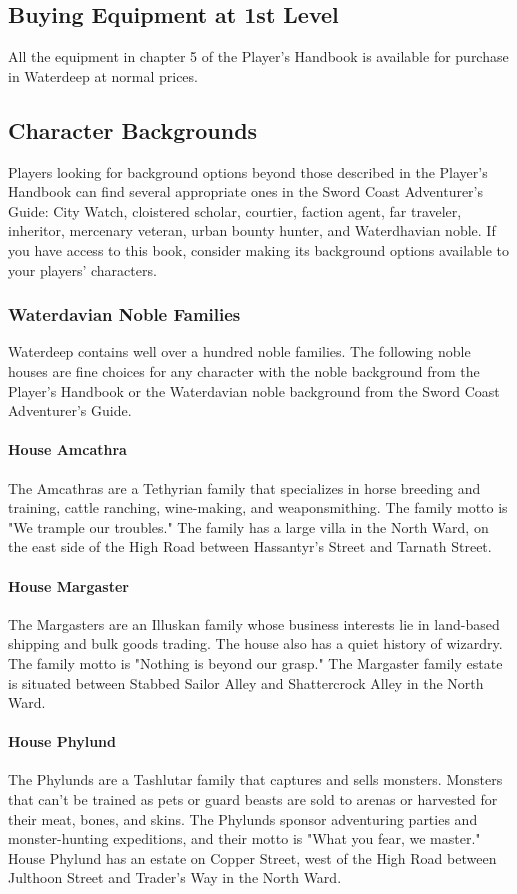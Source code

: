 \documentclass[10pt,a4paper,twoside,twocolumn,openany,nodeprecatedcode]{dndbook}
\begin{document}
\subsection{Buying Equipment at 1st Level}
All the equipment in chapter 5 of the Player's Handbook is available for purchase in Waterdeep at normal prices.
\subsection{Character Backgrounds}
Players looking for background options beyond those described in the Player's Handbook can find several appropriate ones in the Sword Coast Adventurer's Guide: City Watch, cloistered scholar, courtier, faction agent, far traveler, inheritor, mercenary veteran, urban bounty hunter, and Waterdhavian noble. If you have access to this book, consider making its background options available to your players' characters.
\subsubsection{Waterdavian Noble Families}
Waterdeep contains well over a hundred noble families. The following noble houses are fine choices for any character with the noble background from the Player's Handbook or the Waterdavian noble background from the Sword Coast Adventurer's Guide.
\paragraph{House Amcathra}
The Amcathras are a Tethyrian family that specializes in horse breeding and training, cattle ranching, wine-making, and weaponsmithing. The family motto is "We trample our troubles." The family has a large villa in the North Ward, on the east side of the High Road between Hassantyr's Street and Tarnath Street.
\paragraph{House Margaster}
The Margasters are an Illuskan family whose business interests lie in land-based shipping and bulk goods trading. The house also has a quiet history of wizardry. The family motto is "Nothing is beyond our grasp." The Margaster family estate is situated between Stabbed Sailor Alley and Shattercrock Alley in the North Ward.
\paragraph{House Phylund}
The Phylunds are a Tashlutar family that captures and sells monsters. Monsters that can't be trained as pets or guard beasts are sold to arenas or harvested for their meat, bones, and skins. The Phylunds sponsor adventuring parties and monster-hunting expeditions, and their motto is "What you fear, we master." House Phylund has an estate on Copper Street, west of the High Road between Julthoon Street and Trader's Way in the North Ward.
\end{document}
